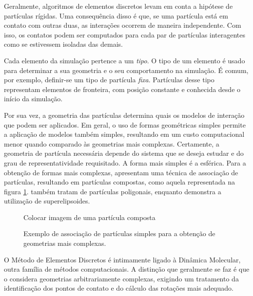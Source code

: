 Geralmente, algoritmos de elementos discretos levam em conta a hipótese de partículas rígidas. Uma consequência disso é que, se uma partícula está em contato com outras duas, as interações ocorrem de maneira independente. Com isso, os contatos podem ser computados para cada par de partículas interagentes como se estivessem isoladas das demais.

Cada elemento da simulação pertence a um \textit{tipo}. O tipo de um elemento é usado para determinar a sua geometria e o seu comportamento na simulação. É comum, por exemplo, definir-se um tipo de partícula \textit{fixa}. Partículas desse tipo representam elementos de fronteira, com posição constante e conhecida desde o início da simulação.

Por sua vez, a geometria das partículas determina quais os modelos de interação que podem ser aplicados. Em geral, o uso de formas geométricas simples permite a aplicação de modelos também simples, resultando em um custo computacional menor quando comparado às geometrias mais complexas. Certamente, a geometria de partícula necessária depende do sistema que se deseja estudar e do grau de representatividade requisitado. A forma mais simples é a esférica. Para a obtenção de formas mais complexas,  apresentam uma técnica de associação de partículas, resultando em partículas compostas, como aquela representada na figura \ref{fig:composite_particle}.  também tratam de partículas poligonais, enquanto  demonstra a utilização de superelipsoides.

\begin{figure}[h]
	\caption{Exemplo de associação de partículas simples para a obtenção de geometrias mais complexas.}
	\centering
		\alert{Colocar imagem de uma partícula composta}
	\label{fig:composite_particle}
\end{figure}

O Método de Elementos Discretos é intimamente ligado à Dinâmica Molecular, outra família de métodos computacionais. A distinção que geralmente se faz é que o \DEM{} considera geometrias arbitrariamente complexas, exigindo um tratamento da identificação dos pontos de contato e do cálculo das rotações mais adequado.

